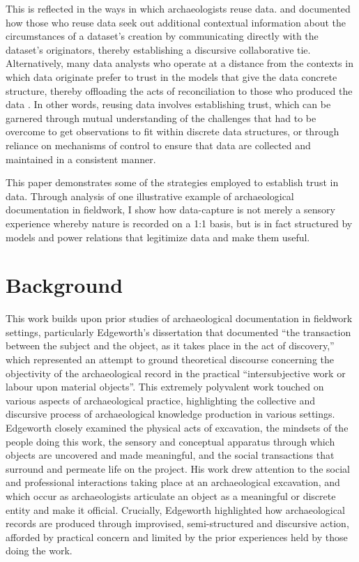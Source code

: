 \documentclass{article}
\begin{document}
This is reflected in the ways in which archaeologists reuse data.
\textcite{faniel2013} and \textcite{atici2013} documented how those who
reuse data seek out additional contextual information about the
circumstances of a dataset's creation by communicating directly with the
dataset's originators, thereby establishing a discursive collaborative
tie. Alternatively, many data analysts who operate at a distance from
the contexts in which data originate prefer to trust in the models that
give the data concrete structure, thereby offloading the acts of
reconciliation to those who produced the data \parencite{huggett2022}. In
other words, reusing data involves establishing trust, which can be
garnered through mutual understanding of the challenges that had to be
overcome to get observations to fit within discrete data structures, or
through reliance on mechanisms of control to ensure that data are
collected and maintained in a consistent manner.

This paper demonstrates some of the strategies employed to establish
trust in data. Through analysis of one illustrative example of
archaeological documentation in fieldwork, I show how data-capture is
not merely a sensory experience whereby nature is recorded on a 1:1
basis, but is in fact structured by models and power relations that
legitimize data and make them useful.

\section{Background}
This work builds upon prior studies of archaeological documentation in
fieldwork settings, particularly Edgeworth's
\parencite*[28]{edgeworth1991} dissertation that documented ``the
transaction between the subject and the object, as it takes place in the
act of discovery,'' which represented an attempt to ground theoretical
discourse concerning the objectivity of the archaeological record in the
practical ``intersubjective work or labour upon material objects''. This
extremely polyvalent work touched on various aspects of archaeological
practice, highlighting the collective and discursive process of
archaeological knowledge production in various settings. Edgeworth
closely examined the physical acts of excavation, the mindsets of the
people doing this work, the sensory and conceptual apparatus through
which objects are uncovered and made meaningful, and the social
transactions that surround and permeate life on the project. His work
drew attention to the social and professional interactions taking place
at an archaeological excavation, and which occur as archaeologists
articulate an object as a meaningful or discrete entity and make it
official. Crucially, Edgeworth highlighted how archaeological records
are produced through improvised, semi-structured and discursive action,
afforded by practical concern and limited by the prior experiences held
by those doing the work.
\end{document}
